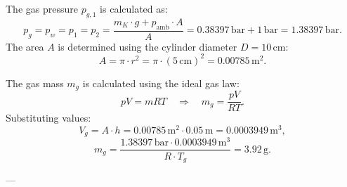 The gas pressure \( p_{g,1} \) is calculated as:  
\[
p_{g} = p_{w} = p_{1} = p_{2} = \frac{m_K \cdot g + p_{\text{amb}} \cdot A}{A} = 0.38397 \, \text{bar} + 1 \, \text{bar} = 1.38397 \, \text{bar}.
\]  
The area \( A \) is determined using the cylinder diameter \( D = 10 \, \text{cm} \):  
\[
A = \pi \cdot r^2 = \pi \cdot (5 \, \text{cm})^2 = 0.00785 \, \text{m}^2.
\]  

The gas mass \( m_g \) is calculated using the ideal gas law:  
\[
pV = mRT \quad \Rightarrow \quad m_g = \frac{pV}{RT}.
\]  
Substituting values:  
\[
V_g = A \cdot h = 0.00785 \, \text{m}^2 \cdot 0.05 \, \text{m} = 0.0003949 \, \text{m}^3,
\]  
\[
m_g = \frac{1.38397 \, \text{bar} \cdot 0.0003949 \, \text{m}^3}{R \cdot T_g} = 3.92 \, \text{g}.
\]  

---